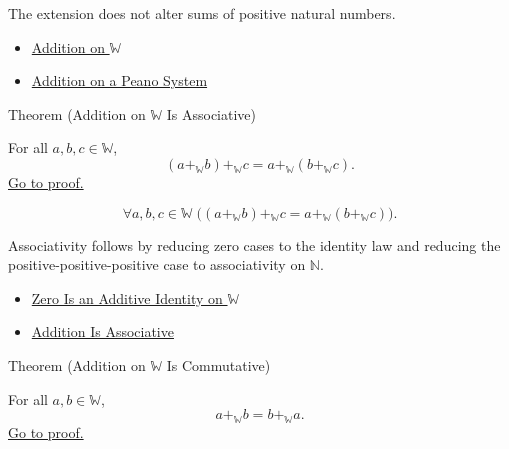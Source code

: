 \begin{remark*}[Interpretation]
The extension does not alter sums of positive natural numbers.
\end{remark*}

\begin{dependencies}
\begin{itemize}
  \item \hyperref[def:addition-on-w]{Addition on $\mathbb{W}$}
  \item \hyperref[def:addition-on-peano-system]{Addition on a Peano System}
\end{itemize}
\end{dependencies}

\begin{theorembox}{Theorem (Addition on \texorpdfstring{$\mathbb{W}$}{W} Is Associative)}
\begin{theorem}
\label{thm:addition-on-w-associative}
For all $a,b,c\in\mathbb{W}$,
\[
(a+_{\mathbb{W}}b)+_{\mathbb{W}}c
=
a+_{\mathbb{W}}(b+_{\mathbb{W}}c).
\]
\hyperref[prf:addition-on-w-associative]{Go to proof.}
\end{theorem}
\end{theorembox}

\begin{remark*}
\[
\forall a,b,c\in\mathbb{W}\;
\bigl((a+_{\mathbb{W}}b)+_{\mathbb{W}}c
=a+_{\mathbb{W}}(b+_{\mathbb{W}}c)\bigr).
\]
\end{remark*}

\begin{remark*}[Interpretation]
Associativity follows by reducing zero cases to the identity law and reducing
the positive-positive-positive case to associativity on $\mathbb{N}$.
\end{remark*}

\begin{dependencies}
\begin{itemize}
  \item \hyperref[thm:zero-additive-identity-on-w]{Zero Is an Additive Identity on $\mathbb{W}$}
  \item \hyperref[thm:addition-associative]{Addition Is Associative}
\end{itemize}
\end{dependencies}

\begin{theorembox}{Theorem (Addition on \texorpdfstring{$\mathbb{W}$}{W} Is Commutative)}
\begin{theorem}
\label{thm:addition-on-w-commutative}
For all $a,b\in\mathbb{W}$,
\[
a+_{\mathbb{W}}b=b+_{\mathbb{W}}a.
\]
\hyperref[prf:addition-on-w-commutative]{Go to proof.}
\end{theorem}
\end{theorembox}

